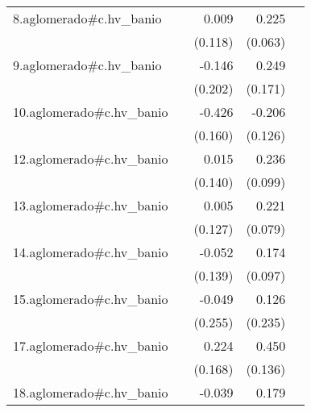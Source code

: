 {\begin{longtable}{l*{4}{D{.}{.}{-1}}}
\addlinespace
8.aglomerado#c.hv\_banio&                     &       0.009         &       0.225\sym{***}&                     \\
            &                     &     (0.118)         &     (0.063)         &                     \\
\addlinespace
9.aglomerado#c.hv\_banio&                     &      -0.146         &       0.249         &                     \\
            &                     &     (0.202)         &     (0.171)         &                     \\
\addlinespace
10.aglomerado#c.hv\_banio&                     &      -0.426\sym{**} &      -0.206         &                     \\
            &                     &     (0.160)         &     (0.126)         &                     \\
\addlinespace
12.aglomerado#c.hv\_banio&                     &       0.015         &       0.236\sym{*}  &                     \\
            &                     &     (0.140)         &     (0.099)         &                     \\
\addlinespace
13.aglomerado#c.hv\_banio&                     &       0.005         &       0.221\sym{**} &                     \\
            &                     &     (0.127)         &     (0.079)         &                     \\
\addlinespace
14.aglomerado#c.hv\_banio&                     &      -0.052         &       0.174         &                     \\
            &                     &     (0.139)         &     (0.097)         &                     \\
\addlinespace
15.aglomerado#c.hv\_banio&                     &      -0.049         &       0.126         &                     \\
            &                     &     (0.255)         &     (0.235)         &                     \\
\addlinespace
17.aglomerado#c.hv\_banio&                     &       0.224         &       0.450\sym{***}&                     \\
            &                     &     (0.168)         &     (0.136)         &                     \\
\addlinespace
18.aglomerado#c.hv\_banio&                     &      -0.039         &       0.179\sym{**} &                     \\

\end{longtable}}
